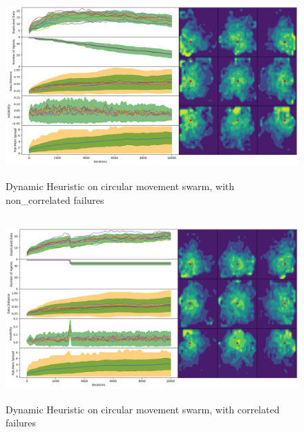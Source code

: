 \documentclass{UoYCSproject}
\begin{document}
\begin{figure}[htb]
\label{fig:circle_movement_non2}
\begin{center}
\centering
\includegraphics[height=7cm]{"./Dynamic_Heuristic/Cicrle_Move_non.png"}
\caption{Dynamic Heuristic on circular movement swarm, with non\_correlated failures}
\end{center}
\end{figure}

\begin{figure}[htb]
\label{fig:circle_movement_con2}
\begin{center}
\centering
\includegraphics[height=7cm]{"./Dynamic_Heuristic/Circle_Move_con.png"}
\caption{Dynamic Heuristic on circular movement swarm, with correlated failures}
\end{center}
\end{figure}

\end{document}
